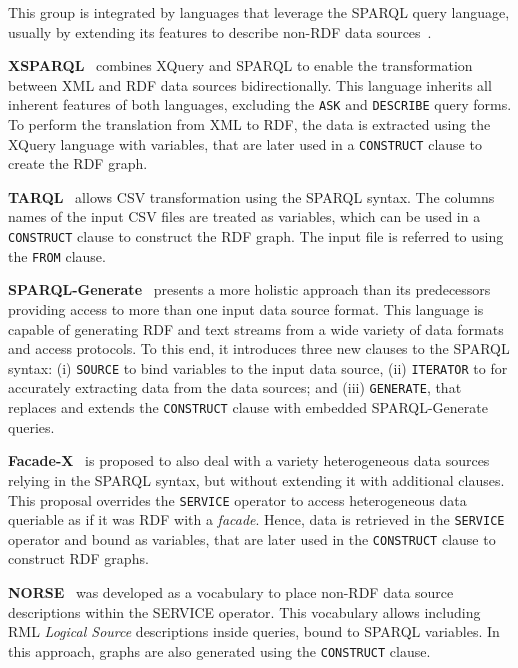 This group is integrated by languages that leverage the SPARQL query language, usually by extending its features to describe non-RDF data sources~\parencite{harris2013sparql}. 


\noindent\textbf{XSPARQL}~\parencite{Bischof2012xsparql} combines XQuery and SPARQL to enable the transformation between XML and RDF data sources bidirectionally. This language inherits all inherent features of both languages, excluding the \texttt{ASK} and \texttt{DESCRIBE} query forms. To perform the translation from XML to RDF, the data is extracted using the XQuery language with variables, that are later used in a \texttt{CONSTRUCT} clause to create the RDF graph. 

\noindent\textbf{TARQL}~\parencite{tarql} allows CSV transformation using the SPARQL syntax. The columns names of the input CSV files are treated as variables, which can be used in a \texttt{CONSTRUCT} clause to construct the RDF graph. The input file is referred to using the \texttt{FROM} clause. 

\noindent\textbf{SPARQL-Generate}~\parencite{Lefrancois2017sparqlgenerate} presents a more holistic approach than its predecessors providing access to more than one input data source format. This language is capable of generating RDF and text streams from a wide variety of data formats and access protocols. To this end, it introduces three new clauses to the SPARQL syntax: (i) \texttt{SOURCE} to bind variables to the input data source, (ii) \texttt{ITERATOR} to for accurately extracting data from the data sources; and (iii) \texttt{GENERATE}, that replaces and extends the \texttt{CONSTRUCT} clause with embedded SPARQL-Generate queries. 

\noindent\textbf{Facade-X}~\parencite{daga2021facade} is proposed to also deal with a variety heterogeneous data sources relying in the SPARQL syntax, but without extending it with additional clauses. This proposal overrides the \texttt{SERVICE} operator to access heterogeneous data queriable as if it was RDF with a \textit{facade}. Hence, data is retrieved in the \texttt{SERVICE} operator and bound as variables, that are later used in the \texttt{CONSTRUCT} clause to construct RDF graphs. 

\noindent\textbf{NORSE}~\parencite{stadler2023spark} was developed as a vocabulary to place non-RDF data source descriptions within the SERVICE operator. This vocabulary allows including RML \textit{Logical Source} descriptions inside queries, bound to SPARQL variables. In this approach, graphs are also generated using the \texttt{CONSTRUCT} clause. 




